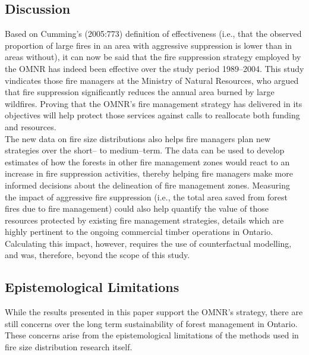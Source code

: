 \begin{spacing}{1.5}
\phantom
\phantom
\phantom
\phantom
\section{Discussion}
\phantom
\phantom
Based on Cumming's (2005:773) definition of effectiveness (i.e., that the observed proportion of large fires in an area with aggressive suppression is lower than in areas without), it can now be said that the fire suppression strategy employed by the OMNR has indeed been effective over the study period 1989--2004. This study vindicates those fire managers at the Ministry of Natural Resources, who argued that fire suppression significantly reduces the annual area burned by large wildfires. Proving that the OMNR's fire management strategy has delivered in its objectives will help protect those services against calls to reallocate both funding and resources. \\

\noindent The new data on fire size distributions also helps fire managers plan  new strategies over the short-- to medium--term. The data can be used to develop estimates of how the forests in other fire management zones would react to an increase in fire suppression activities, thereby helping fire managers make more informed decisions about the delineation of fire management zones. Measuring the impact of aggressive fire suppression (i.e., the total area saved from forest fires due to fire management) could also help quantify the value of those resources protected by existing fire management strategies, details which are highly pertinent to the ongoing commercial timber operations in Ontario. Calculating this impact, however, requires the use of counterfactual modelling, and was, therefore, beyond the scope of this study.

\subsection{Epistemological Limitations}
While the results presented in this paper support the OMNR's strategy, there are still concerns over the long term sustainability of forest management in Ontario. These concerns arise from the epistemological limitations of the methods used in fire size distribution research itself. \\

\clearpage


\end{spacing}
